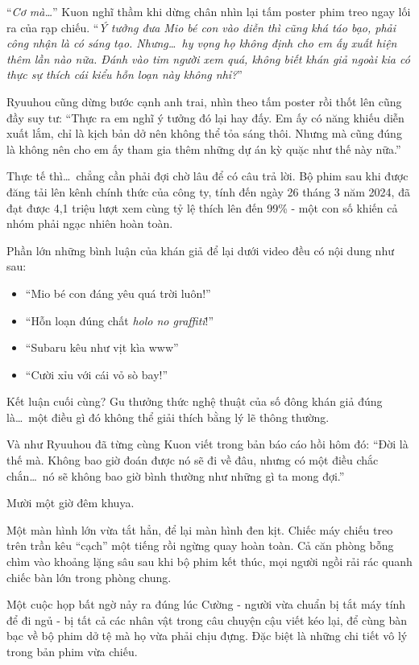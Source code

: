 \documentclass[../main.tex]{subfiles}
\begin{document}
``\textit{Cơ mà\dots}'' Kuon nghĩ thầm khi dừng chân nhìn lại tấm poster phim treo ngay lối ra của rạp chiếu. ``\textit{Ý tưởng đưa Mio bé con vào diễn thì cũng khá táo bạo, phải công nhận là có sáng tạo. Nhưng\dots\ hy vọng họ không định cho em ấy xuất hiện thêm lần nào nữa. Đánh vào tim người xem quá, không biết khán giả ngoài kia có thực sự thích cái kiểu hỗn loạn này không nhỉ?}''

Ryuuhou cũng dừng bước cạnh anh trai, nhìn theo tấm poster rồi thốt lên cũng đầy suy tư: ``Thực ra em nghĩ ý tưởng đó lại hay đấy. Em ấy có năng khiếu diễn xuất lắm, chỉ là kịch bản dở nên không thể tỏa sáng thôi. Nhưng mà cũng đúng là không nên cho em ấy tham gia thêm những dự án kỳ quặc như thế này nữa.''

Thực tế thì\dots\ chẳng cần phải đợi chờ lâu để có câu trả lời. Bộ phim sau khi được đăng tải lên kênh chính thức của công ty, tính đến ngày 26 tháng 3 năm 2024, đã đạt được 4,1 triệu lượt xem cùng tỷ lệ thích lên đến 99\% - một con số khiến cả nhóm phải ngạc nhiên hoàn toàn.

Phần lớn những bình luận của khán giả để lại dưới video đều có nội dung như sau:
\begin{itemize}
  \item ``Mio bé con đáng yêu quá trời luôn!''
  \item ``Hỗn loạn đúng chất \textit{holo no graffiti}!''
  \item ``Subaru kêu như vịt kìa www''
  \item ``Cười xỉu với cái vỏ sò bay!''
\end{itemize}

Kết luận cuối cùng? Gu thưởng thức nghệ thuật của số đông khán giả đúng là\dots\ một điều gì đó không thể giải thích bằng lý lẽ thông thường.

Và như Ryuuhou đã từng cùng Kuon viết trong bản báo cáo hồi hôm đó: ``Đời là thế mà. Không bao giờ đoán được nó sẽ đi về đâu, nhưng có một điều chắc chắn\dots\ nó sẽ không bao giờ bình thường như những gì ta mong đợi.''

\ct

Mười một giờ đêm khuya.

Một màn hình lớn vừa tắt hẳn, để lại màn hình đen kịt. Chiếc máy chiếu treo trên trần kêu ``cạch'' một tiếng rồi ngừng quay hoàn toàn. Cả căn phòng bỗng chìm vào khoảng lặng sâu sau khi bộ phim kết thúc, mọi người ngồi rải rác quanh chiếc bàn lớn trong phòng chung.

Một cuộc họp bất ngờ nảy ra đúng lúc Cường - người vừa chuẩn bị tắt máy tính để đi ngủ - bị tất cả các nhân vật trong câu chuyện cậu viết kéo lại, để cùng bàn bạc về bộ phim dở tệ mà họ vừa phải chịu đựng. Đặc biệt là những chi tiết vô lý trong bản phim vừa chiếu.
\end{document}
